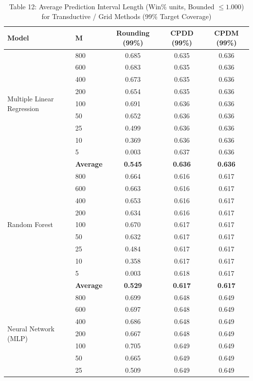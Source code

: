 \documentclass[11pt,a4paper]{article}
\begin{document}
\begin{table}[H]
\centering
\caption{Table 12: Average Prediction Interval Length (Win\% units, Bounded $\le 1.000$) for Transductive / Grid Methods (99\% Target Coverage)}
\label{tab:team_tab12}
\scriptsize
\begin{tabular}{llccc}
\toprule
Model & M & Rounding (99\%) & CPDD (99\%) & CPDM (99\%) \\
\midrule
\multirow{9}{*}{Multiple Linear Regression}
 & 800 & 0.685 & 0.635 & 0.636 \\
 & 600 & 0.683 & 0.635 & 0.636 \\
 & 400 & 0.673 & 0.635 & 0.636 \\
 & 200 & 0.654 & 0.635 & 0.636 \\
 & 100 & 0.691 & 0.636 & 0.636 \\
 & 50  & 0.652 & 0.636 & 0.636 \\
 & 25  & 0.499 & 0.636 & 0.636 \\
 & 10  & 0.369 & 0.636 & 0.636 \\
 & 5   & 0.003 & 0.637 & 0.636 \\
 & \textbf{Average} & \textbf{0.545} & \textbf{0.636} & \textbf{0.636} \\
\midrule
\multirow{9}{*}{Random Forest}
 & 800 & 0.664 & 0.616 & 0.617 \\
 & 600 & 0.663 & 0.616 & 0.617 \\
 & 400 & 0.653 & 0.616 & 0.617 \\
 & 200 & 0.634 & 0.616 & 0.617 \\
 & 100 & 0.670 & 0.617 & 0.617 \\
 & 50  & 0.632 & 0.617 & 0.617 \\
 & 25  & 0.484 & 0.617 & 0.617 \\
 & 10  & 0.358 & 0.617 & 0.617 \\
 & 5   & 0.003 & 0.618 & 0.617 \\
 & \textbf{Average} & \textbf{0.529} & \textbf{0.617} & \textbf{0.617} \\
\midrule
\multirow{9}{*}{Neural Network (MLP)}
 & 800 & 0.699 & 0.648 & 0.649 \\
 & 600 & 0.697 & 0.648 & 0.649 \\
 & 400 & 0.686 & 0.648 & 0.649 \\
 & 200 & 0.667 & 0.648 & 0.649 \\
 & 100 & 0.705 & 0.649 & 0.649 \\
 & 50  & 0.665 & 0.649 & 0.649 \\
 & 25  & 0.509 & 0.649 & 0.649 \\

\end{tabular}
\end{table}
\end{document}
